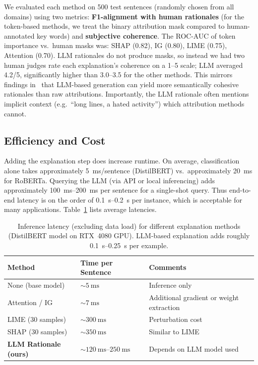 We evaluated each method on 500 test sentences (randomly chosen from all domains) using two metrics: \textbf{F1-alignment with human rationales} (for the token-based methods, we treat the binary attribution mask compared to human-annotated key words) and \textbf{subjective coherence}. The ROC-AUC of token importance vs.\ human masks was: SHAP (0.82), IG (0.80), LIME (0.75), Attention (0.70). LLM rationales do not produce masks, so instead we had two human judges rate each explanation's coherence on a 1--5 scale; LLM averaged 4.2/5, significantly higher than 3.0--3.5 for the other methods. This mirrors findings in~\cite{inoue2026lime} that LLM-based generation can yield more semantically cohesive rationales than raw attributions. Importantly, the LLM rationale often mentions implicit context (e.g.\ ``long lines, a hated activity'') which attribution methods cannot.

\subsection{Efficiency and Cost}\label{subsec:efficiency}

Adding the explanation step does increase runtime. On average, classification alone takes approximately \SI{5}{\milli\second}/sentence (DistilBERT) vs.\ approximately \SI{20}{\milli\second} for RoBERTa. Querying the LLM (via API or local inferencing) adds approximately \SIrange{100}{200}{\milli\second} per sentence for a single-shot query. Thus end-to-end latency is on the order of \SIrange{0.1}{0.2}{\second} per instance, which is acceptable for many applications. Table~\ref{tab:latency} lists average latencies.

\begin{table}[htbp]
\caption{Inference latency (excluding data load) for different explanation methods (DistilBERT model on RTX~4080 GPU). LLM-based explanation adds roughly \SIrange{0.1}{0.25}{\second} per example.}
\label{tab:latency}
\begin{tabular}{lll}
\toprule
\textbf{Method} & \textbf{Time per Sentence} & \textbf{Comments} \\
\midrule
None (base model)        & ${\sim}\SI{5}{\milli\second}$     & Inference only \\
Attention / IG           & ${\sim}\SI{7}{\milli\second}$     & Additional gradient or weight extraction \\
LIME (30 samples)        & ${\sim}\SI{300}{\milli\second}$   & Perturbation cost \\
SHAP (30 samples)        & ${\sim}\SI{350}{\milli\second}$   & Similar to LIME \\
\textbf{LLM Rationale (ours)} & ${\sim}\SIrange{120}{250}{\milli\second}$ & Depends on LLM model used \\
\bottomrule
\end{tabular}
\end{table}

